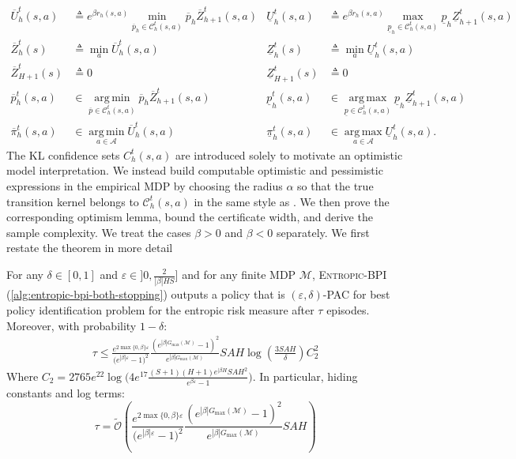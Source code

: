 \documentclass[final,12pt]{colt2026} %
\begin{document}
\begin{align*}
    \overline{U}_h^t(s, a) &\triangleq e^{\beta r_h(s,a)} \min_{\overline{p}_h \in \mathcal{C}_h^t(s,a)} \overline{p}_h \overline{Z}_{h+1}^t(s, a) & 
    \underline{U}_h^t(s, a) &\triangleq e^{\beta r_h(s,a)}\max_{\underline{p}_h \in \mathcal{C}_h^t(s,a)} \underline{p}_h \underline{Z}_{h+1}^t(s, a) \\
    \overline{Z}_h^t(s) &\triangleq \min_{a} \overline{U}_h^t(s, a) & 
    \underline{Z}_h^t(s) &\triangleq \min_{a} \underline{U}_h^t(s, a) \\
    \overline{Z}_{H+1}^t(s) &\triangleq 0 & 
    \underline{Z}_{H+1}^t(s) &\triangleq 0 \\
    \overline{p}_h^t(s, a) &\in \operatorname*{arg\,min}_{\overline{p} \in \mathcal{C}_h^t(s,a)} \overline{p}_h \overline{Z}_{h+1}^t(s, a) & 
    \underline{p}_h^t(s, a) &\in \operatorname*{arg\,max}_{\underline{p} \in \mathcal{C}_h^t(s,a)} \underline{p}_h \underline{Z}_{h+1}^t(s, a) \\
    \overline{\pi}_h^t(s, a) &\in \operatorname*{arg\,min}_{a \in \mathcal{A}} \overline{U}_h^t(s, a) & 
    \underline{\pi}_h^t(s, a) &\in \operatorname*{arg\,max}_{a \in \mathcal{A}} \underline{U}_h^t(s, a).
\end{align*}
The KL confidence sets $C_h^t(s, a)$ are introduced solely to motivate an optimistic model interpretation. We instead build computable optimistic and pessimistic expressions in the empirical MDP by choosing the radius $\alpha$ so that the true transition kernel belongs to $\mathcal{C}_h^t(s,a)$ in the same style as \citep{Menard2021Fast}. We then prove the corresponding optimism lemma, bound the certificate width, and derive the sample complexity. We treat the cases $\beta>0$ and $\beta<0$ separately. We first restate the theorem in more detail
\begingroup
\renewcommand\thetheorem{\ref{th:upper_bound}}
\begin{theorem}
For any $\delta \in [0,1]$ and $\varepsilon \in ]0,\frac{2}{|\beta|HS}]$ and for any finite MDP $\mathcal{M}$, \textsc{Entropic-BPI} (\cref{alg:entropic-bpi-both-stopping}) outputs a policy that is $(\varepsilon,\delta)$-PAC for best policy identification problem for the entropic risk measure after $\tau$ episodes. Moreover, with probability $1 - \delta$:
\begin{align*}
    \tau \leq\frac{e^{2\max\{0,\beta\}\varepsilon}}{\big(e^{|\beta| \varepsilon} - 1\big)^2}\frac{(e^{|\beta| G_{\text{max}}(\mathcal{M})} - 1)^2}{e^{|\beta| G_{\text{max}}(\mathcal{M})}} SAH \log(\frac{3SAH}{\delta}) C_2^2
\end{align*}
Where $C_2 = 2765 e^{22}\log\bigg(4 e^{17} \frac{(S+1)(H+1) e^{|\beta H} S A H^2}{e^{\beta \varepsilon} - 1}\bigg)$. In particular, hiding constants and log terms:
$$\tau = \tilde{\mathcal{O}}\left( \frac{e^{2\max\{0,\beta\}\varepsilon}}{\big(e^{|\beta| \varepsilon} - 1\big)^2}\frac{(e^{|\beta| G_{\text{max}}(\mathcal{M})} - 1)^2}{e^{|\beta| G_{\text{max}}(\mathcal{M})}} SAH  \right)$$
\end{theorem}
\endgroup
\end{document}
